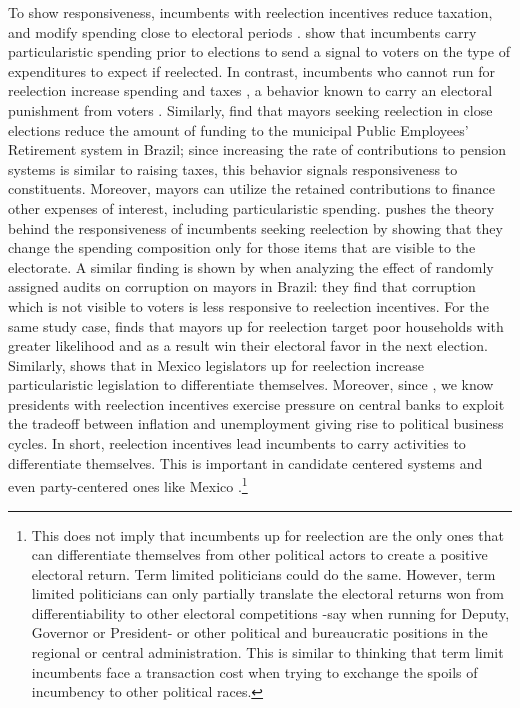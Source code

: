 \documentclass[12pt]{amsart}
\numberwithin{equation}{section}
\theoremstyle{definition}
\theoremstyle{definition}
\theoremstyle{definition}
\begin{document}
To show responsiveness, incumbents with reelection incentives reduce taxation, and modify spending close to electoral periods \citep{Rogoff_1988, Rogoff_1990, klein_sakurai_2015}. \citet{Drazen_eslava_2005} show that incumbents carry particularistic spending prior to elections to send a signal to voters on the type of expenditures to expect if reelected. In contrast, incumbents who cannot run for reelection increase spending and taxes \citep{Besley_case_1995}, a behavior known to carry an electoral punishment from voters \citep{peltzman_1992}. Similarly, \citet{Schettini_2020} find that mayors seeking reelection in close elections reduce the amount of funding to the municipal Public Employees’ Retirement system in Brazil; since increasing the rate of contributions to pension systems is similar to raising taxes, this behavior signals responsiveness to constituents. Moreover, mayors can utilize the retained contributions to finance other expenses of interest, including particularistic spending. \citet{akhmedov_2004} pushes the theory behind the responsiveness of incumbents seeking reelection by showing that they change the spending composition only for those items that are visible to the electorate. A similar finding is shown by \citet{ferraz_finan_2011} when analyzing the effect of randomly assigned audits on corruption on mayors in Brazil: they find that corruption which is not visible to voters is less responsive to reelection incentives. For the same study case,\citet{frey_2021} finds that mayors up for reelection target poor households with greater likelihood and as a result win their electoral favor in the next election. Similarly, \citet{motolinia_2020} shows that in Mexico legislators up for reelection increase particularistic legislation to differentiate themselves. Moreover, since \citet{Nordhaus_1975}, we know presidents with reelection incentives exercise pressure on central banks to exploit the tradeoff between inflation and unemployment giving rise to political business cycles. In short, reelection incentives lead incumbents to carry activities to differentiate themselves. This is important in candidate centered systems and even party-centered ones like Mexico \citep{motolinia_2020}.\footnote{This does not imply that incumbents up for reelection are the only ones that can differentiate themselves from other political actors to create a positive electoral return. Term limited politicians could do the same. However, term limited politicians can only partially translate the electoral returns won from differentiability to other electoral competitions -say when running for Deputy, Governor or President- or other political and bureaucratic positions in the regional or central administration. This is similar to thinking that term limit incumbents face a transaction cost when trying to exchange the spoils of incumbency to other political races.} 
\end{document}
